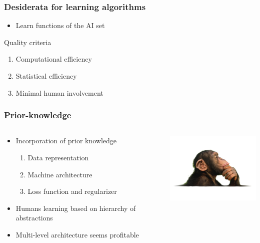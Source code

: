 \begin{frame}
	\frametitle{Desiderata for learning algorithms}
	\begin{itemize}
		\item Learn functions of the AI set
	\end{itemize}
	\begin{block}{Quality criteria}
		\begin{enumerate}
			\item Computational efficiency
			\item Statistical efficiency
			\item Minimal human involvement
		\end{enumerate}
	\end{block}
\end{frame}

\begin{frame}
	\frametitle{Prior-knowledge}
	\begin{columns}
		\begin{column}{6.5cm}
			\begin{itemize}
				\item Incorporation of prior knowledge
				\begin{enumerate}
					\item Data representation
					\item Machine architecture
					\item Loss function and regularizer
				\end{enumerate}
				\item Humans learning based on hierarchy of abstractions
				\item Multi-level architecture seems profitable
			\end{itemize}
		\end{column}
		\begin{column}{5cm}
			\includegraphics[width=5cm]{images/ape.jpg}
		\end{column}
	\end{columns}
\end{frame}

